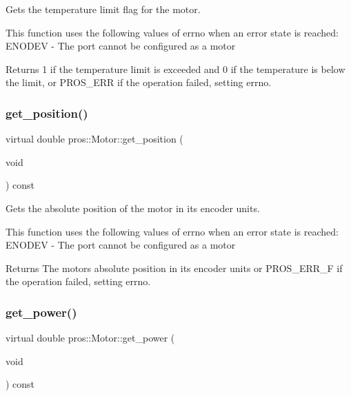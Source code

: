 Gets the temperature limit flag for the motor. 

This function uses the following values of errno when an error state is reached\+: E\+N\+O\+D\+EV -\/ The port cannot be configured as a motor

\begin{DoxyReturn}{Returns}
1 if the temperature limit is exceeded and 0 if the temperature is below the limit, or P\+R\+O\+S\+\_\+\+E\+RR if the operation failed, setting errno. 
\end{DoxyReturn}
\mbox{\label{classpros_1_1Motor_a70e725a94ec42dc7cbb3e460c36dcad3}} 
\subsubsection{\texorpdfstring{get\+\_\+position()}{get\_position()}}
{\footnotesize\ttfamily virtual double pros\+::\+Motor\+::get\+\_\+position (\begin{DoxyParamCaption}\item[{void}]{ }\end{DoxyParamCaption}) const\hspace{0.3cm}{\ttfamily [virtual]}}



Gets the absolute position of the motor in its encoder units. 

This function uses the following values of errno when an error state is reached\+: E\+N\+O\+D\+EV -\/ The port cannot be configured as a motor

\begin{DoxyReturn}{Returns}
The motor\textquotesingle{}s absolute position in its encoder units or P\+R\+O\+S\+\_\+\+E\+R\+R\+\_\+F if the operation failed, setting errno. 
\end{DoxyReturn}
\mbox{\label{classpros_1_1Motor_a51b75dc245257487116e64fa2904d521}} 
\subsubsection{\texorpdfstring{get\+\_\+power()}{get\_power()}}
{\footnotesize\ttfamily virtual double pros\+::\+Motor\+::get\+\_\+power (\begin{DoxyParamCaption}\item[{void}]{ }\end{DoxyParamCaption}) const\hspace{0.3cm}{\ttfamily [virtual]}}



